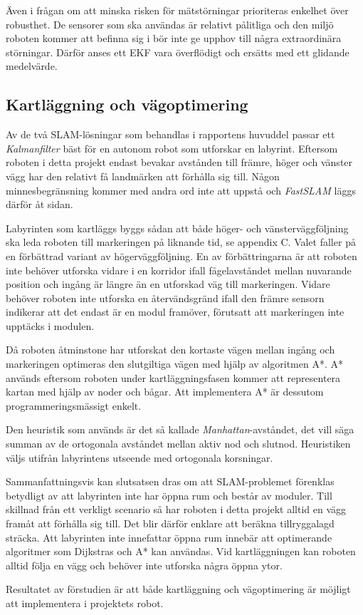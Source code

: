 \documentclass[11pt]{article}
\begin{document}
\begin{flushleft}
Även i frågan om att minska risken för mätstörningar prioriteras enkelhet över robusthet. De sensorer som ska användas är relativt pålitliga och den miljö roboten kommer att befinna sig i bör inte ge upphov till några extraordinära störningar. Därför anses ett EKF vara överflödigt och ersätts med ett glidande medelvärde.


\subsection{Kartläggning och vägoptimering}
Av de två SLAM-lösningar som behandlas i rapportens huvuddel passar ett \emph{Kalmanfilter} bäst för en autonom robot som utforskar en labyrint.  Eftersom roboten i detta projekt endast bevakar avstånden till främre, höger och vänster vägg har den relativt få landmärken att förhålla sig till. Någon minnesbegränsning kommer med andra ord inte att uppstå och \emph{FastSLAM} läggs därför åt sidan.

Labyrinten som kartläggs byggs sådan att både höger- och vänsterväggföljning ska leda roboten till markeringen på liknande tid, se appendix C. Valet faller på en förbättrad variant av högerväggföljning. En av förbättringarna är att roboten inte behöver utforska vidare i en korridor ifall fågelavståndet mellan nuvarande position och ingång är längre än en utforskad väg till markeringen. Vidare behöver roboten inte utforska en återvändsgränd ifall den främre sensorn indikerar att det endast är en modul framöver, förutsatt att markeringen inte upptäcks i modulen. 

Då roboten åtminstone har utforskat den kortaste vägen mellan ingång och markeringen optimeras den slutgiltiga vägen med hjälp av algoritmen A*. A* används eftersom roboten under kartläggningsfasen kommer att representera kartan med hjälp av noder och bågar. Att implementera A* är dessutom programmeringsmässigt enkelt.

Den heuristik som används är det så kallade \emph{Manhattan}-avståndet, det vill säga summan av de ortogonala avståndet mellan aktiv nod och slutnod. Heuristiken väljs utifrån labyrintens utseende med ortogonala korsningar. 

Sammanfattningsvis kan slutsatsen dras om att SLAM-problemet förenklas betydligt av att labyrinten inte har öppna rum och består av moduler. Till skillnad från ett verkligt scenario så har roboten i detta projekt alltid en vägg framåt att förhålla sig till. Det blir därför enklare att beräkna tillryggalagd sträcka. Att labyrinten inte innefattar öppna rum innebär att optimerande algoritmer som Dijkstras och A* kan användas. Vid kartläggningen kan roboten alltid följa en vägg och behöver inte utforska några öppna ytor.

Resultatet av förstudien är att både kartläggning och vägoptimering är möjligt att implementera i projektets robot.  

\pagebreak
{}




\end{flushleft}
\end{document}
